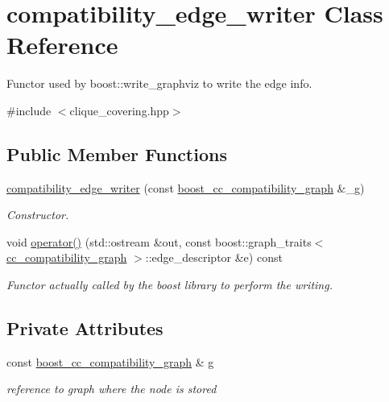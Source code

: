 \hypertarget{classcompatibility__edge__writer}{}\section{compatibility\+\_\+edge\+\_\+writer Class Reference}
\label{classcompatibility__edge__writer}


Functor used by boost\+::write\+\_\+graphviz to write the edge info.  




{\ttfamily \#include $<$clique\+\_\+covering.\+hpp$>$}

\subsection*{Public Member Functions}
\begin{DoxyCompactItemize}
\item 
\hyperlink{classcompatibility__edge__writer_ad116a8610f2ffb7590aa6c07999e1ab2}{compatibility\+\_\+edge\+\_\+writer} (const \hyperlink{clique__covering__graph_8hpp_af47b1c28cf9a2c360afafb8d80582ce6}{boost\+\_\+cc\+\_\+compatibility\+\_\+graph} \&\+\_\+g)
\begin{DoxyCompactList}\small\item\em Constructor. \end{DoxyCompactList}\item 
void \hyperlink{classcompatibility__edge__writer_a9f2fdec3c7333198b4f43f8d12b0377e}{operator()} (std\+::ostream \&out, const boost\+::graph\+\_\+traits$<$ \hyperlink{clique__covering__graph_8hpp_aa88e9419fe776ef37020cacd507cc4ad}{cc\+\_\+compatibility\+\_\+graph} $>$\+::edge\+\_\+descriptor \&e) const
\begin{DoxyCompactList}\small\item\em Functor actually called by the boost library to perform the writing. \end{DoxyCompactList}\end{DoxyCompactItemize}
\subsection*{Private Attributes}
\begin{DoxyCompactItemize}
\item 
const \hyperlink{clique__covering__graph_8hpp_af47b1c28cf9a2c360afafb8d80582ce6}{boost\+\_\+cc\+\_\+compatibility\+\_\+graph} \& \hyperlink{classcompatibility__edge__writer_affd0efcf4091ba434faf4e2a0b11a70b}{g}
\begin{DoxyCompactList}\small\item\em reference to graph where the node is stored \end{DoxyCompactList}\end{DoxyCompactItemize}


